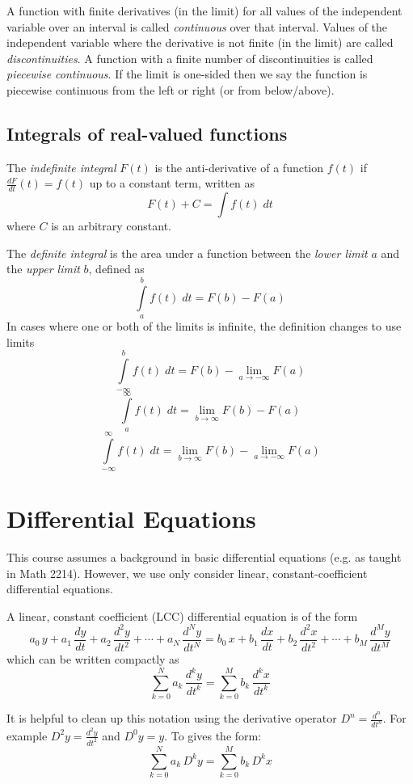A function with finite derivatives (in the limit) for all values of the independent variable over an interval is called \textit{continuous} over that interval. Values of the independent variable where the derivative is not finite (in the limit) are called \textit{discontinuities}. A function with a finite number of discontinuities is called \textit{piecewise continuous}. If the limit is one-sided then we say the function is piecewise continuous from the left or right (or from below/above).

\subsection*{Integrals of real-valued functions}

The \textit{indefinite integral} $F(t)$ is the anti-derivative of a function $f(t)$ if $\frac{dF}{dt}(t) = f(t)$ up to a constant term, written as
\[
F(t) + C = \int f(t)\; dt
\]
where $C$ is an arbitrary constant.

The \textit{definite integral} is the area under a function between the \textit{lower limit} $a$ and the \textit{upper limit} $b$, defined as
\[
\int\limits_{a}^{b} f(t) \; dt = F(b) - F(a)
\]
In cases where one or both of the limits is infinite, the definition changes to use limits
\[
\int\limits_{-\infty}^{b} f(t) \; dt = F(b) - \lim_{a\rightarrow -\infty} F(a)
\]
\[
\int\limits_{a}^{\infty} f(t) \; dt = \lim_{b\rightarrow \infty} F(b) - F(a)
\]
\[
\int\limits_{-\infty}^{\infty} f(t) \; dt = \lim_{b\rightarrow \infty} F(b) - \lim_{a\rightarrow -\infty} F(a)
\]

\section{Differential Equations}

This course assumes a background in basic differential equations (e.g. as taught in Math 2214). However, we use only consider linear, constant-coefficient differential equations.

A linear, constant coefficient (LCC) differential equation is of the form
\[
a_0\, y + a_1\, \frac{dy}{dt} + a_2\, \frac{d^2y}{dt^2} + \cdots + a_N\, \frac{d^Ny}{dt^N}  = b_0\, x + b_1\, \frac{dx}{dt} + b_2\, \frac{d^2x}{dt^2} + \cdots + b_M\, \frac{d^My}{dt^M}
\]
which can be written compactly as
\[
\sum\limits_{k = 0}^{N} a_k\, \frac{d^ky}{dt^k} = \sum\limits_{k = 0}^{M} b_k\, \frac{d^kx}{dt^k}
\]

It is helpful to clean up this notation using the derivative operator $D^n = \frac{d^n}{dt^n}$. For example
$D^2y = \frac{d^2y}{dt^2}$ and $D^0 y= y$. To gives the form:
\[
\sum\limits_{k = 0}^{N} a_k\, D^k y = \sum\limits_{k = 0}^{M} b_k\, D^k x
\]


